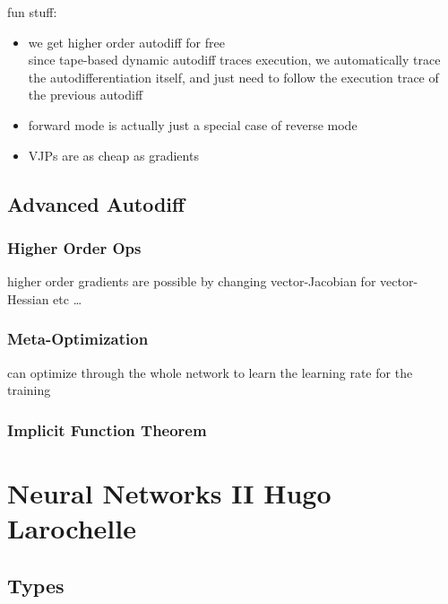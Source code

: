 \documentclass[]{article}
\theoremstyle{definition}
\begin{document}
    fun stuff:
    \begin{itemize}
        \item we get higher order autodiff for free \\
            since tape-based dynamic autodiff traces execution, we automatically trace the autodifferentiation itself,
            and just need to follow the execution trace of the previous autodiff
        \item forward mode is actually just a special case of reverse mode
        \item VJPs are as cheap as gradients
    \end{itemize}

    \subsection{Advanced Autodiff}%
    \label{sub:advanced_autodiff}

    \subsubsection{Higher Order Ops}%
    \label{ssub:higher_order_ops}

    higher order gradients are possible by changing vector-Jacobian for vector-Hessian etc \ldots

    \subsubsection{Meta-Optimization}%
    \label{ssub:meta_optimization}

    can optimize through the whole network to learn the learning rate for the training

    \subsubsection{Implicit Function Theorem}%
    \label{ssub:implicit_function_theorem}



    \section{Neural Networks II {\small Hugo Larochelle}}%
    \label{sec:neural_networks_ii_small_hugo_larochelle_}

    \subsection{Types}%
    \label{sub:types}
\end{document}
